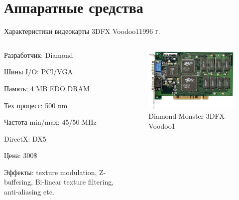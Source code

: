 \documentclass{beamer}
\begin{document}
\section{Аппаратные средства}

\begin{frame}{Характеристики видеокарты 3DFX Voodoo1}{1996 г.}
	\begin{columns}
		\begin{column}{0.5\textwidth}
			Разработчик: Diamond
			
			Шины I/O: PCI/VGA
			
			Память: 4 MB EDO DRAM
			
			Тех процесс: 500 nm
			
			Частота min/max: 45/50 MHz
			
			DirectX: DX5
			
			Цена: 300\$
			
			Эффекты: texture modulation, Z-buffering, Bi-linear texture filtering, anti-aliasing etc.
		\end{column}
		\begin{column}{0.5\textwidth}
			\begin{figure} 
				\includegraphics[width=\textwidth]{images/Diamond_Monster_3D_3DFX_Voodoo1.png}
				\caption {Diamond Monster 3DFX Voodoo1}
			\end{figure}
			
		\end{column}
	\end{columns}
\end{frame}
\end{document}
